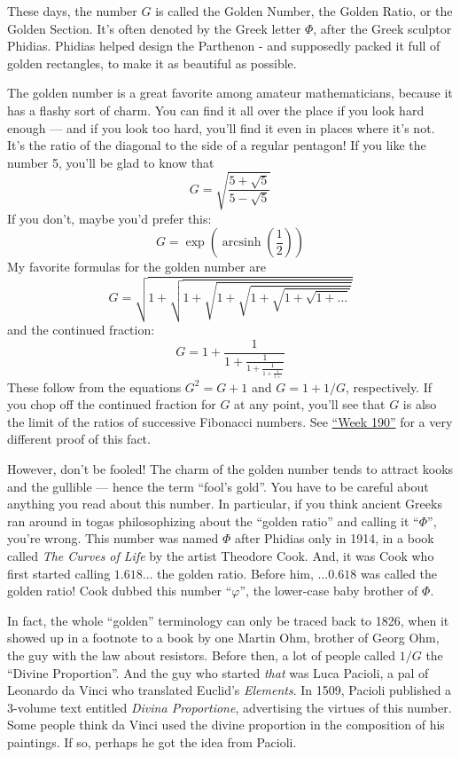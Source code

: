\documentclass{article}
\begin{document}
These days, the number \(G\) is called the Golden Number, the Golden
Ratio, or the Golden Section. It's often denoted by the Greek letter
\(\Phi\), after the Greek sculptor Phidias. Phidias helped design the
Parthenon - and supposedly packed it full of golden rectangles, to make
it as beautiful as possible.

The golden number is a great favorite among amateur mathematicians,
because it has a flashy sort of charm. You can find it all over the
place if you look hard enough --- and if you look too hard, you'll find
it even in places where it's not. It's the ratio of the diagonal to the
side of a regular pentagon! If you like the number 5, you'll be glad to
know that \[G = \sqrt{\frac{5+\sqrt{5}}{5-\sqrt{5}}}\] If you don't,
maybe you'd prefer this:
\[G = \exp\left(\operatorname{arcsinh}\left(\frac12\right)\right)\] My
favorite formulas for the golden number are
\[G = \sqrt{1 + \sqrt{1 + \sqrt{1 + \sqrt{1 + \sqrt{1 + \sqrt{1 + \ldots}}}}}}\]
and the continued fraction:
\[G = 1 + \frac{1}{1 + \frac{1}{1 + \frac{1}{1 + \frac{1}{1 + }}}}\]
These follow from the equations \(G^2 = G + 1\) and \(G = 1 + 1/G\),
respectively. If you chop off the continued fraction for \(G\) at any
point, you'll see that \(G\) is also the limit of the ratios of
successive Fibonacci numbers. See \protect\hyperlink{week190}{``Week
190''} for a very different proof of this fact.

However, don't be fooled! The charm of the golden number tends to
attract kooks and the gullible --- hence the term ``fool's gold''. You
have to be careful about anything you read about this number. In
particular, if you think ancient Greeks ran around in togas
philosophizing about the ``golden ratio'' and calling it ``\(\Phi\)'',
you're wrong. This number was named \(\Phi\) after Phidias only in 1914,
in a book called \emph{The Curves of Life} by the artist Theodore Cook.
And, it was Cook who first started calling \(1.618\ldots\) the golden
ratio. Before him, \(\ldots0.618\) was called the golden ratio! Cook
dubbed this number ``\(\varphi\)'', the lower-case baby brother of
\(\Phi\).

In fact, the whole ``golden'' terminology can only be traced back to
1826, when it showed up in a footnote to a book by one Martin Ohm,
brother of Georg Ohm, the guy with the law about resistors. Before then,
a lot of people called \(1/G\) the ``Divine Proportion''. And the guy
who started \emph{that} was Luca Pacioli, a pal of Leonardo da Vinci who
translated Euclid's \emph{Elements}. In 1509, Pacioli published a
3-volume text entitled \emph{Divina Proportione}, advertising the
virtues of this number. Some people think da Vinci used the divine
proportion in the composition of his paintings. If so, perhaps he got
the idea from Pacioli.
\end{document}
